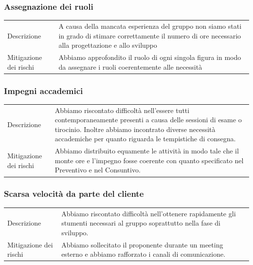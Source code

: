 \documentclass{article}
\begin{document}
\subsubsection{Assegnazione dei ruoli}
\begin{center}
\begin{tabular}{P{10em} P{20em}} 
     Descrizione &  A causa della mancata esperienza del gruppo non siamo stati in grado di stimare correttamente il numero di ore necessario alla progettazione e allo sviluppo\\ 
    Mitigazione dei rischi &  Abbiamo approfondito il ruolo di ogni singola figura in modo da assegnare i ruoli coerentemente alle necessità\\
\end{tabular}
\label{tab:mitruoli}
\end{center}

\subsubsection{Impegni accademici}
\begin{center}
\begin{tabular}{P{10em} P{20em}} 
     Descrizione & Abbiamo riscontato difficoltà nell'essere tutti contemporaneamente presenti a causa delle sessioni di esame o tirocinio. Inoltre abbiamo incontrato diverse necessità accademiche per quanto riguarda le tempistiche di consegna. \\ 
    Mitigazione dei rischi & Abbiamo distribuito equamente le attività in modo tale che il monte ore e l'impegno fosse coerente con quanto specificato nel Preventivo e nel Consuntivo.  \\
\end{tabular}
\label{tab:mitimpegni}
\end{center}

\subsubsection{Scarsa velocità da parte del cliente}
\begin{center}
\begin{tabular}{P{10em} P{20em}} 
     Descrizione & Abbiamo riscontato difficoltà nell'ottenere rapidamente gli stumenti necessari al gruppo soprattutto nella fase di sviluppo. \\ 
    Mitigazione dei rischi & Abbiamo sollecitato il proponente durante un meeting esterno e abbiamo rafforzato i canali di comunicazione. \\
\end{tabular}
\label{tab:mitcliente}
\end{center}
\end{document}
